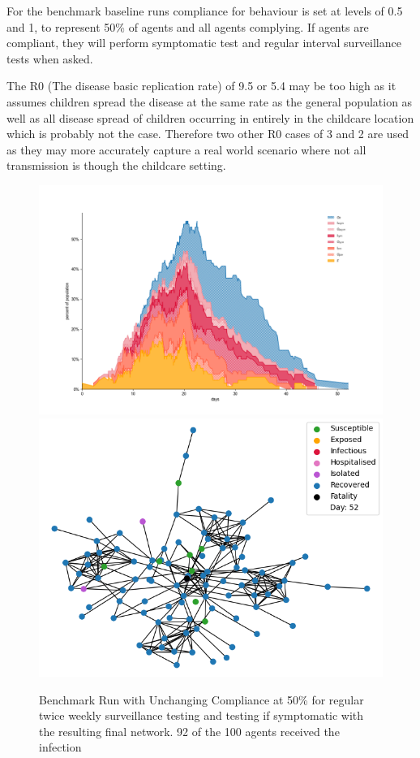 \documentclass{article}
\begin{document}
For the benchmark baseline runs compliance for behaviour is set at levels of 0.5 and 1, to represent 50\% of agents and all agents complying. If agents are compliant, they will perform symptomatic test and regular interval surveillance tests when asked.

The R0 (The disease basic replication rate) of 9.5 or 5.4 may be too high as it assumes children spread the disease at the same rate as the general population as well as all disease spread of children occurring in entirely in the childcare location which is probably not the case. Therefore two other R0 cases of 3 and 2 are used as they may more accurately capture a real world scenario where not all transmission is though the childcare setting.

\begin{figure}
\centering
\includegraphics[width=\textwidth]{Figure3}
\includegraphics[width=\textwidth]{Figure3Net}
\caption{Benchmark Run with Unchanging Compliance at 50\% for regular twice weekly surveillance testing and testing if symptomatic with the resulting final network. 92 of the 100 agents received the infection}
\end{figure}
\end{document}
